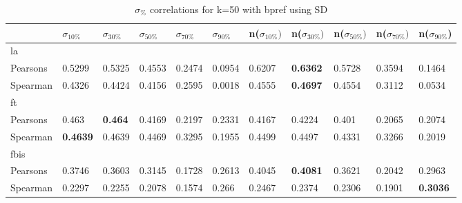 \documentclass{sig-alternate}
\begin{document}
\begin{table}[h!]
\centering
\begin{tabular}{|l||l|l|l|l|l||l|l|l|l|l|}
\hline
& $\sigma_{10\%}$ & $\sigma_{30\%}$ & $\sigma_{50\%}$ & $\sigma_{70\%}$ & $\sigma_{90\%}$ & n($\sigma_{10\%})$ & n($\sigma_{30\%})$ & n($\sigma_{50\%})$ & n($\sigma_{70\%})$ & n($\sigma_{90\%}$) \\ \hline
\hline la &  &  &  &  &  &  &  &  &  &  \\ \hline
Pearsons & 0.5299 & 0.5325 & 0.4553 & 0.2474 & 0.0954 & 0.6207 & \textbf{0.6362} & 0.5728 & 0.3594 & 0.1464 \\ \hline
Spearman & 0.4326 & 0.4424 & 0.4156 & 0.2595 & 0.0018 & 0.4555 & \textbf{0.4697} & 0.4554 & 0.3112 & 0.0534 \\ \hline
\hline ft &  &  &  &  &  &  &  &  &  &  \\ \hline
Pearsons & 0.463 & \textbf{0.464} & 0.4169 & 0.2197 & 0.2331 & 0.4167 & 0.4224 & 0.401 & 0.2065 & 0.2074 \\ \hline
Spearman & \textbf{0.4639} & 0.4639 & 0.4469 & 0.3295 & 0.1955 & 0.4499 & 0.4497 & 0.4331 & 0.3266 & 0.2019 \\ \hline
\hline fbis &  &  &  &  &  &  &  &  &  &  \\ \hline
Pearsons & 0.3746 & 0.3603 & 0.3145 & 0.1728 & 0.2613 & 0.4045 & \textbf{0.4081} & 0.3621 & 0.2042 & 0.2963 \\ \hline
Spearman & 0.2297 & 0.2255 & 0.2078 & 0.1574 & 0.266 & 0.2467 & 0.2374 & 0.2306 & 0.1901 & \textbf{0.3036} \\ \hline
\end{tabular}
\caption{$\sigma_{\%}$ correlations for k=50 with bpref using SD}
\end{table}
\end{document}
